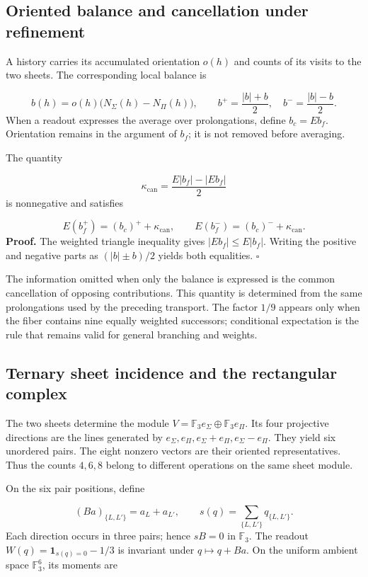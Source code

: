 \subsection{Oriented balance and cancellation under refinement}
A history carries its accumulated orientation \(o(h)\) and counts of its visits to the two sheets. The corresponding local balance is

\[
b(h)=o(h)\bigl(N_\Sigma(h)-N_\Pi(h)\bigr),
\qquad
b^+=\frac{|b|+b}{2},\quad b^-=\frac{|b|-b}{2}.
\]
When a readout expresses the average over prolongations, define \(b_c=Eb_f\). Orientation remains in the argument of \(b_f\); it is not removed before averaging.

The quantity

\[
\kappa_{\mathrm{can}}=
\frac{E|b_f|-|Eb_f|}{2}
\]
is nonnegative and satisfies

\[
E(b_f^+)=(b_c)^++\kappa_{\mathrm{can}},
\qquad
E(b_f^-)=(b_c)^-+\kappa_{\mathrm{can}}.
\]
\textbf{Proof.} The weighted triangle inequality gives \(|Eb_f|\leq E|b_f|\). Writing the positive and negative parts as \((|b|\pm b)/2\) yields both equalities. \hfill\(\square\)

The information omitted when only the balance is expressed is the common cancellation of opposing contributions. This quantity is determined from the same prolongations used by the preceding transport. The factor \(1/9\) appears only when the fiber contains nine equally weighted successors; conditional expectation is the rule that remains valid for general branching and weights.

\subsection{Ternary sheet incidence and the rectangular complex}
The two sheets determine the module \(V=\mathbb F_3e_\Sigma\oplus\mathbb F_3e_\Pi\). Its four projective directions are the lines generated by \(e_\Sigma,e_\Pi,e_\Sigma+e_\Pi,e_\Sigma-e_\Pi\). They yield six unordered pairs. The eight nonzero vectors are their oriented representatives. Thus the counts \(4,6,8\) belong to different operations on the same sheet module.

On the six pair positions, define

\[
(Ba)_{\{L,L'\}}=a_L+a_{L'},
\qquad
s(q)=\sum_{\{L,L'\}}q_{\{L,L'\}}.
\]
Each direction occurs in three pairs; hence \(sB=0\) in \(\mathbb F_3\). The readout \(W(q)=\mathbf1_{s(q)=0}-1/3\) is invariant under \(q\mapsto q+Ba\). On the uniform ambient space \(\mathbb F_3^6\), its moments are


